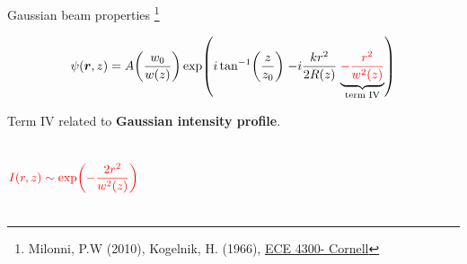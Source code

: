 \documentclass[12pt, dvipsnames]{beamer}
\numberwithin{equation}{section}
\newcommand\blfootnote[1]{%
	\begingroup
	\renewcommand\thefootnote{}\footnote{#1}%
	\addtocounter{footnote}{-1}%
	\endgroup
}
\begin{document}
\begin{frame}[t]{Gaussian beam properties}\blfootnote{Milonni, P.W (2010), Kogelnik, H. (1966), \href{https://www.youtube.com/playlist?list=PLyWzPf87clvEb8T3Xf30tMaUqdbVchrNY}{ECE 4300- Cornell}}%
	\vspace{-16pt} 
	$$\psi(\boldsymbol{r},z)=A
	{\left(\frac{w_0}{w(z)}\right)}
	\exp(
	{i\tan[-1](\frac{z}{z_0})}\;
	{-i\frac{kr^2}{2R(z)}}\;
	{\underbrace{\color{red}-\frac{r^2}{w^2(z)}}_{\text{term IV}}}
	)$$
	
	{Term IV related to \textbf{Gaussian intensity profile}.\pause
	\begin{columns}
				$$\color{red}I(r,z)\sim \exp(-\frac{2r^2}{w^2(z)})$$\pause
			
	\end{columns}}
\end{frame}
\end{document}

